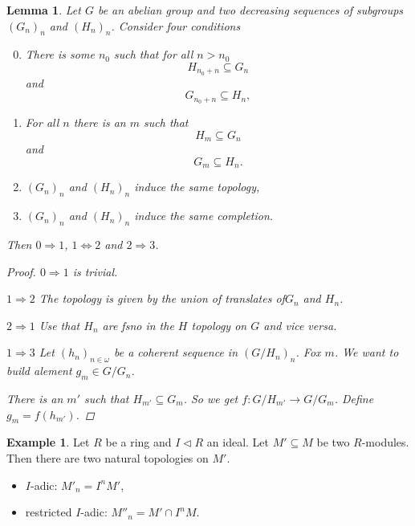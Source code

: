 \documentclass{article}
\newcommand{\ideal}{\triangleleft}
\newtheorem{lemma}[theorem]{Lemma}
\theoremstyle{definition}
\newtheorem{example}[theorem]{Example}
\begin{document}
\begin{lemma}
    Let \(G\) be an abelian group and two decreasing sequences of subgroups
    \((G_{n})_{n}\) and \((H_{n})_{n}\). Consider four conditions
    \begin{enumerate}
        \setcounter{enumi}{-1}
        \item There is some \(n_{0}\) such that for all \(n>n_{0}\)
              \[
                  H_{n_{0}+n}\subseteq G_{n}
              \]
              and
              \[
                  G_{n_{0}+n}\subseteq H_{n},
              \]
        \item For all \(n\) there is an \(m\) such that
              \[
                  H_{m}\subseteq G_{n}
              \]
              and
              \[
                  G_{m}\subseteq H_{n}.
              \]
        \item \((G_{n})_{n}\) and \((H_{n})_{n}\) induce the same topology,
        \item \((G_{n})_{n}\) and \((H_{n})_{n}\) induce the same completion.
    \end{enumerate}
    Then \(0\Rightarrow1\), \(1\Leftrightarrow2\) and \(2\Rightarrow3\).

    \begin{proof}
        \(0\Rightarrow1\) is trivial.

        \(1\Rightarrow 2\) The topology is given by the union of translates
        of\(G_{n}\) and \(H_{n}\).

        \(2\Rightarrow 1\) Use that \(H_{n}\) are fsno in the \(H\) topology on
        \(G\) and vice versa.

        \(1\Rightarrow3\) Let \((h_{n})_{n\in\omega}\)  be a coherent sequence
        in \((G/H_{n})_{n}\). Fox \(m\). We want to build alement \(g_{m}\in
        G/G_{n}\).

        There is an \(m'\) such that \(H_{m'}\subseteq G_{m}\). So we get
        \(f:G/H_{m'}\to G/G_{m}\). Define \(g_{m}=f(h_{m'})\).
    \end{proof}
\end{lemma}

\begin{example}
    Let \(R\) be a ring and \(I\ideal R\) an ideal. Let \(M'\subseteq M\) be two
    \(R\)-modules. Then there are two natural topologies on \(M'\).
    \begin{itemize}
        \item \(I\)-adic: \(M'_{n}=I^{n}M'\),
        \item restricted \(I\)-adic: \(M''_{n}=M'\cap I^{n}M\).
    \end{itemize}
\end{example}
\end{document}
